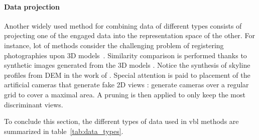		\paragraph{Data projection}
			Another widely used method for combining data of different types consists of projecting one of the engaged data into the representation space of the other. For instance, lot of methods consider the challenging problem of registering photographies upon 3D models~\citep{Baatz2012,Kendall2015,Arth2015,Pascoe2015,Pascoe2015a,Pascoe2015b}. Similarity comparison is performed thanks to synthetic images generated from the 3D models \citep{Russell2011,Mason2011,Aubry2014,Poglitsch2015}. Notice the synthesis of skyline profiles from DEM in the work of \citet{Baatz2012}. Special attention is paid to placement of the artificial cameras that generate fake 2D views \citep{Irschara2009,Gee2012,Torii2015}: \citet{Aubry2014} generate cameras over a regular grid to cover a maximal area. A pruning is then applied to only keep the most discriminant views.

To conclude this section, the different types of data used in \ac{vbl} methods are summarized in table~\ref{tab:data_types}.

